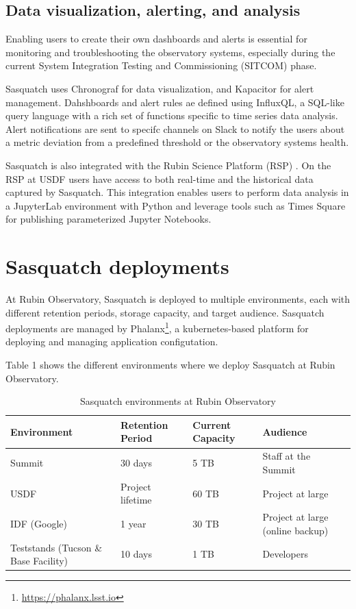 \subsection{Data visualization, alerting, and analysis}

Enabling users to create their own dashboards and alerts is essential for monitoring and troubleshooting the observatory systems, especially during the current System Integration Testing and Commissioning (SITCOM) phase.

Sasquatch uses Chronograf for data visualization, and Kapacitor for alert management. Dahshboards and alert rules ae defined using InfluxQL, a SQL-like query language with a rich set of functions specific to time series data analysis. Alert notifications are sent to specifc channels on Slack to notify the users about a metric deviation from a predefined threshold or the observatory systems health.

Sasquatch is also integrated with the Rubin Science Platform (RSP) \cite{DMTN-082, DMTN-212}. On the RSP at USDF users have access to both real-time and the historical data captured by Sasquatch. This integration enables users to perform data analysis in a JupyterLab environment with Python and leverage tools such as Times Square \cite{SQR-062} for publishing parameterized Jupyter Notebooks.

\section{Sasquatch deployments}
\label{sec:deploy}

At Rubin Observatory, Sasquatch is deployed to multiple environments, each with different retention periods, storage capacity, and target audience. Sasquatch deployments are managed by Phalanx\footnote{\url{https://phalanx.lsst.io}}, a kubernetes-based platform for deploying and managing application configutation.

Table 1 shows the different environments where we deploy Sasquatch at Rubin Observatory.

\begin{table}[ht]
    \small
    \centering
    \caption{Sasquatch environments at Rubin Observatory}
    \begin{tabular}{@{}llll@{}}
        \toprule
        \textbf{Environment} & \textbf{Retention Period} & \textbf{Current Capacity} & \textbf{Audience} \\
        \midrule
        Summit & 30 days & 5 TB & Staff at the Summit \\
        USDF & Project lifetime & 60 TB & Project at large \\
        IDF (Google) & 1 year & 30 TB & Project at large (online backup) \\
        Teststands (Tucson \& Base Facility) & 10 days & 1 TB & Developers \\
        \bottomrule
    \end{tabular}
\end{table}

